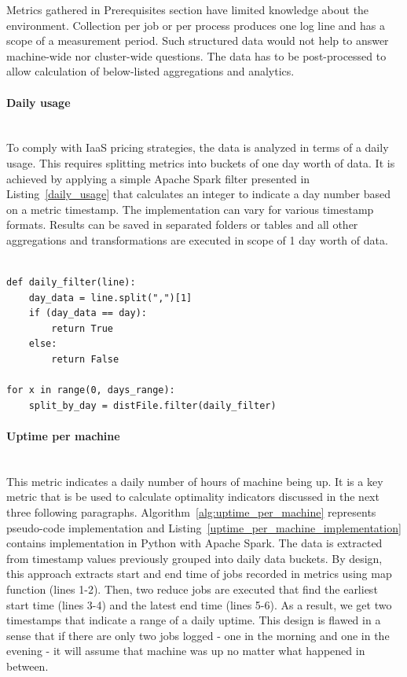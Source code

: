\documentclass[]{final_report}
\newcommand{\myparagraph}[1]{\paragraph{#1}\mbox{}\\}
\begin{document}
Metrics gathered in Prerequisites section have limited knowledge about the environment. Collection per job or per process produces one log line and has a scope of a measurement period. Such structured data would not help to answer machine-wide nor cluster-wide questions. The data has to be post-processed to allow calculation of below-listed aggregations and analytics.   

\myparagraph{Daily usage}

To comply with IaaS pricing strategies, the data is analyzed in terms of a daily usage. This requires splitting metrics into buckets of one day worth of data. 
It is achieved by applying a simple Apache Spark filter presented in Listing~\ref{daily_usage} that calculates an integer to indicate a day number based on a metric timestamp. The implementation can vary for various timestamp formats. Results can be saved in separated folders or tables and all other aggregations and transformations are executed in scope of 1 day worth of data.

\begin{minipage}{\textwidth}
\begin{lstlisting}[label={daily_usage},caption={Daily usage filter},frame=single]

def daily_filter(line):
    day_data = line.split(",")[1]
    if (day_data == day):
        return True
    else:
        return False

for x in range(0, days_range):
    split_by_day = distFile.filter(daily_filter)

\end{lstlisting} 
\end{minipage}


\myparagraph{Uptime per machine}

This metric indicates a daily number of hours of machine being up. It is a key metric that is be used to calculate optimality indicators discussed in the next three following paragraphs. Algorithm~\ref{alg:uptime_per_machine} represents pseudo-code implementation and Listing~\ref{uptime_per_machine_implementation} contains implementation in Python with Apache Spark. The data is extracted from timestamp values previously grouped into daily data buckets. By design, this approach extracts start and end time of jobs recorded in metrics using map function (lines 1-2). Then, two reduce jobs are executed that find the earliest start time (lines 3-4) and the latest end time (lines 5-6). As a result, we get two timestamps that indicate a range of a daily uptime. This design is flawed in a sense that if there are only two jobs logged - one in the morning and one in the evening - it will assume that machine was up no matter what happened in between.
\end{document}
